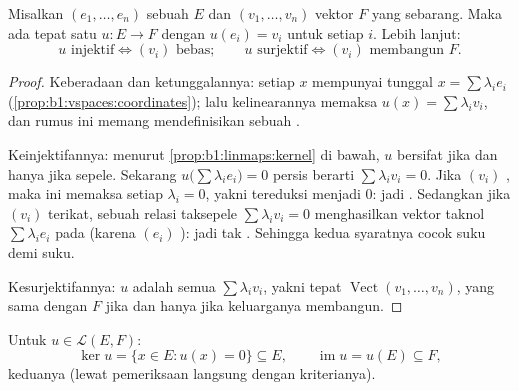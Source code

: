 \begin{proposition}\label{prop:b1:linmaps:basis}
Misalkan $(e_1, \dots, e_n)$ sebuah  $E$ dan $(v_1, \dots, v_n)$
vektor $F$ yang sebarang. Maka ada tepat satu  $u \colon
E \to F$ dengan $u(e_i) = v_i$ untuk setiap $i$. Lebih lanjut:
\[
u \text{ injektif} \iff (v_i) \text{ bebas};
\qquad
u \text{ surjektif} \iff (v_i) \text{ membangun } F .
\]
\end{proposition}

\begin{proof}
Keberadaan dan ketunggalannya: setiap $x$ mempunyai  tunggal $x = \sum
\lambda_i e_i$ (\cref{prop:b1:vspaces:coordinates}); lalu kelinearannya
memaksa $u(x) = \sum \lambda_i v_i$, dan rumus ini memang mendefinisikan sebuah
.

Keinjektifannya: menurut \cref{prop:b1:linmaps:kernel} di bawah, $u$ bersifat
 jika dan hanya jika  sepele. Sekarang $u\bigl(\sum\lambda_i
e_i\bigr) = 0$ persis berarti $\sum\lambda_i v_i = 0$. Jika $(v_i)$
, maka ini memaksa setiap $\lambda_i = 0$, yakni 
tereduksi menjadi $0$: jadi . Sedangkan jika $(v_i)$ terikat, sebuah relasi
taksepele $\sum\lambda_i v_i = 0$ menghasilkan vektor taknol
$\sum\lambda_i e_i$ pada  (karena $(e_i)$ ): jadi tak
. Sehingga kedua syaratnya cocok suku demi suku.

Kesurjektifannya:  $u$ adalah  semua $\sum\lambda_i
v_i$, yakni tepat $\operatorname{Vect}(v_1, \dots, v_n)$, yang
sama dengan $F$ jika dan hanya jika keluarganya membangun.
\end{proof}

\begin{definition}\label{def:b1:linmaps:kerim}
Untuk $u \in \mathcal{L}(E, F)$:
\[
\ker u = \{x \in E : u(x) = 0\} \subseteq E,
\qquad
\operatorname{im} u = u(E) \subseteq F ,
\]
keduanya  (lewat pemeriksaan langsung dengan
kriterianya).
\end{definition}

